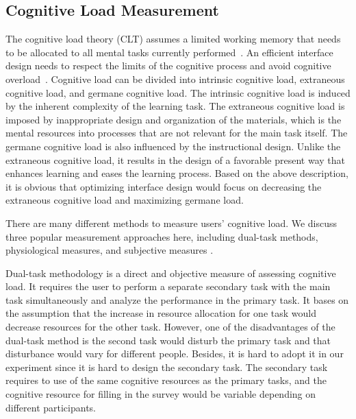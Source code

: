 \subsection{Cognitive Load Measurement}
The cognitive load theory (CLT) assumes a limited working memory that needs to be allocated to all mental tasks currently performed~\cite{tracy2006measuring}. An efficient interface design needs to respect the limits of the cognitive process and avoid cognitive overload~\cite{tracy2006measuring}. Cognitive load can be divided into intrinsic cognitive load, extraneous cognitive load, and germane cognitive load.\cite{klepsch2017development}\cite{schmutz2009cognitive} The intrinsic cognitive load is induced by the inherent complexity of the learning task.\cite{klepsch2017development} The extraneous cognitive load is imposed by inappropriate design and organization of the materials, which is the mental resources into processes that are not relevant for the main task itself.\cite{klepsch2017development} The germane cognitive load is also influenced by the instructional design. Unlike the extraneous cognitive load, it results in the design of a favorable present way that enhances learning and eases the learning process. \cite{paas2003cognitive}\cite{klepsch2017development} Based on the above description, it is obvious that optimizing interface design would focus on decreasing the extraneous cognitive load and maximizing germane load. \cite{schmutz2009cognitive} 

There are many different methods to measure users’ cognitive load. We discuss three popular measurement approaches here, including dual-task methods, physiological measures, and subjective measures \cite{klepsch2017development, tracy2006measuring, chen2017construct}.

Dual-task methodology is a direct and objective measure of assessing cognitive load.\cite{schmutz2009cognitive} It requires the user to perform a separate secondary task with the main task simultaneously and analyze the performance in the primary task.\cite{klepsch2017development}\cite{schmutz2009cognitive}\cite{chen2017construct} It bases on the assumption that the increase in resource allocation for one task would decrease resources for the other task.\cite{klepsch2017development}\cite{schmutz2009cognitive} However, one of the disadvantages of the dual-task method is the second task would disturb the primary task and that disturbance would vary for different people.\cite{klepsch2017development} Besides, it is hard to adopt it in our experiment since it is hard to design the secondary task. The secondary task requires to use of the same cognitive resources as the primary tasks, and the cognitive resource for filling in the survey would be variable depending on different participants.\cite{moray2013mental}

